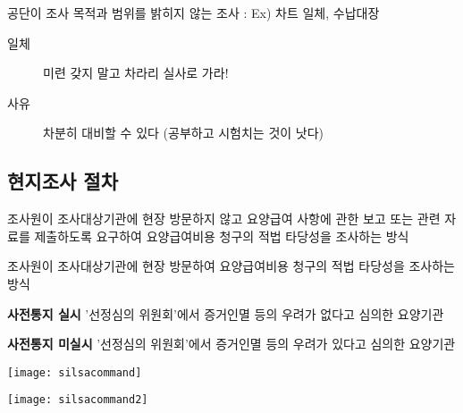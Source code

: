 공단이 조사 목적과 범위를 밝히지 않는 조사 : Ex) 차트 일체, 수납대장 \par
\begin{description}
\item[일체] 미련 갖지 말고 차라리 실사로 가라!
\item[사유] 차분히 대비할 수 있다 (공부하고 시험치는 것이 낫다)
\end{description}
\subsection{현지조사 절차}
\begin{description}\tightlist
\item[서면조사] 조사원이 조사대상기관에 현장 방문하지 않고 요양급여 사항에 관한 보고 또는 관련 자료를 제출하도록 요구하여 요양급여비용 청구의 적법 타당성을 조사하는 방식
\item[현장조사] 조사원이 조사대상기관에 현장 방문하여 요양급여비용 청구의 적법 타당성을 조사하는 방식
\end{description}

\textbf{사전통지 실시} '선정심의 위원회'에서 증거인멸 등의 우려가 없다고 심의한 요양기관\par
{}\par

\textbf{사전통지 미실시} '선정심의 위원회'에서 증거인멸 등의 우려가 있다고 심의한 요양기관\par
{}\par

\texttt{[image: silsacommand]}\par

\texttt{[image: silsacommand2]}

